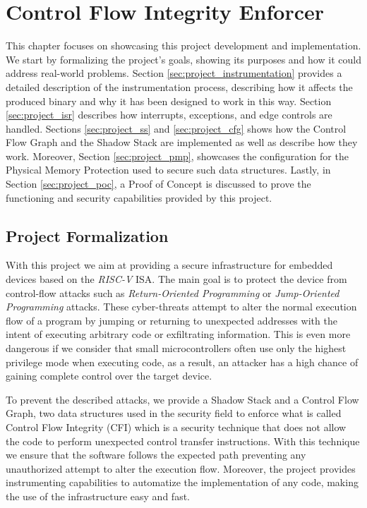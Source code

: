 \chapter{Control Flow Integrity Enforcer}
\label{cha:project}

This chapter focuses on showcasing this project development and implementation. We
start by formalizing the project's goals, showing its purposes and how it could
address real-world problems. Section \ref{sec:project_instrumentation} provides a
detailed description of the instrumentation process, describing how it affects
the produced binary and why it has been designed to work in this way. Section \ref{sec:project_isr}
describes how interrupts, exceptions, and edge controls are handled. Sections
\ref{sec:project_ss} and \ref{sec:project_cfg} shows how the Control Flow Graph
and the Shadow Stack are implemented as well as describe how they work. Moreover,
Section \ref{sec:project_pmp}, showcases the configuration for the Physical Memory
Protection used to secure such data structures. Lastly, in Section \ref{sec:project_poc},
a Proof of Concept is discussed to prove the functioning and security
capabilities provided by this project.

\section{Project Formalization}
\label{sec:project_formalization}

With this project we aim at providing a secure infrastructure for embedded devices
based on the \textit{RISC-V} ISA. The main goal is to protect the device from control-flow
attacks such as \textit{Return-Oriented Programming} or \textit{Jump-Oriented
Programming} attacks. These cyber-threats attempt to alter the normal execution
flow of a program by jumping or returning to unexpected addresses with the
intent of executing arbitrary code or exfiltrating information. This is even more
dangerous if we consider that small microcontrollers often use only the highest privilege
mode when executing code, as a result, an attacker has a high chance of gaining complete
control over the target device.

To prevent the described attacks, we provide a Shadow Stack and a Control Flow
Graph, two data structures used in the security field to enforce what is called Control
Flow Integrity (CFI) which is a security technique that does not allow the code to
perform unexpected control transfer instructions. With this technique we ensure
that the software follows the expected path preventing any unauthorized attempt
to alter the execution flow. Moreover, the project provides instrumenting
capabilities to automatize the implementation of any code, making the use of the
infrastructure easy and fast.

